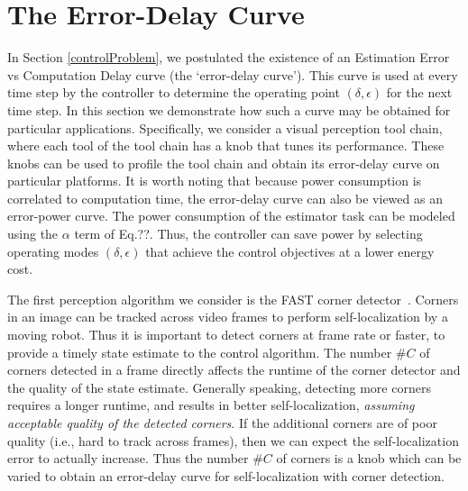 \section{The Error-Delay Curve}
\label{delayErrorCurve}

In Section \ref{controlProblem}, we postulated the existence of an Estimation Error vs Computation Delay curve (the `error-delay curve').
This curve is used at every time step by the controller to determine the operating point $(\delta, \epsilon)$ for the next time step.
In this section we demonstrate how such a curve may be obtained for particular applications. 
Specifically, we consider a visual perception tool chain, where each tool of the tool chain has a knob that tunes its performance.
These knobs can be used to profile the tool chain and obtain its error-delay curve on particular platforms.
It is worth noting that because power consumption is correlated to computation time, the error-delay curve can also be viewed as an error-power curve.
The power consumption of the estimator task can be modeled using the $\alpha$ term of Eq.??.
Thus, the controller can save power by selecting operating modes $(\delta,\epsilon)$ that achieve the control objectives at a lower energy cost.

The first perception algorithm we consider is the FAST corner detector~\cite{rosten_2006_machine}.
Corners in an image can be tracked across video frames to perform self-localization by a moving robot. 
Thus it is important to detect corners at frame rate or faster, to provide a timely state estimate to the control algorithm.
The number $\#C$ of corners detected in a frame directly affects the runtime of the corner detector and the quality of the state estimate.
Generally speaking, detecting more corners requires a longer runtime, and results in better self-localization, \emph{assuming acceptable quality of the detected corners}.
If the additional corners are of poor quality (i.e., hard to track across frames), then we can expect the self-localization error to actually increase.
Thus the number $\#C$ of corners is a knob which can be varied to obtain an error-delay curve for self-localization with corner detection. 

